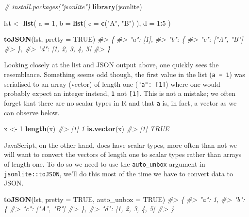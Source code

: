 \documentclass[10pt,]{krantz}
\makeatletter
\newenvironment{Shaded}{\begin{snugshade}}{\end{snugshade}}
\newcommand{\CommentTok}[1]{\textcolor[rgb]{0.37,0.37,0.37}{\textit{#1}}}
\newcommand{\DataTypeTok}[1]{\textcolor[rgb]{0.27,0.27,0.27}{#1}}
\newcommand{\DecValTok}[1]{\textcolor[rgb]{0.06,0.06,0.06}{#1}}
\newcommand{\KeywordTok}[1]{\textcolor[rgb]{0.27,0.27,0.27}{\textbf{#1}}}
\newcommand{\NormalTok}[1]{#1}
\newcommand{\OperatorTok}[1]{\textcolor[rgb]{0.43,0.43,0.43}{\textbf{#1}}}
\newcommand{\OtherTok}[1]{\textcolor[rgb]{0.37,0.37,0.37}{#1}}
\newcommand{\StringTok}[1]{\textcolor[rgb]{0.5,0.5,0.5}{#1}}
\newenvironment{kframe}{%
\medskip{}
\setlength{\fboxsep}{.8em}
 \def\at@end@of@kframe{}%
 \ifinner\ifhmode%
  \def\at@end@of@kframe{\end{minipage}}%
  \begin{minipage}{\columnwidth}%
 \fi\fi%
 \def\FrameCommand##1{\hskip\@totalleftmargin \hskip-\fboxsep
 \colorbox{shadecolor}{##1}\hskip-\fboxsep
     \hskip-\linewidth \hskip-\@totalleftmargin \hskip\columnwidth}%
 \MakeFramed {\advance\hsize-\width
   \@totalleftmargin\z@ \linewidth\hsize
   \@setminipage}}%
 {\par\unskip\endMakeFramed%
 \at@end@of@kframe}
\renewenvironment{Shaded}{\begin{kframe}}{\end{kframe}}
\makeatother
\begin{document}
\begin{Shaded}
\begin{Highlighting}[]
\CommentTok{# install.packages("jsonlite")}
\KeywordTok{library}\NormalTok{(jsonlite)}

\NormalTok{lst <-}\StringTok{ }\KeywordTok{list}\NormalTok{(}
  \DataTypeTok{a =} \DecValTok{1}\NormalTok{,}
  \DataTypeTok{b =} \KeywordTok{list}\NormalTok{(}
    \DataTypeTok{c =} \KeywordTok{c}\NormalTok{(}\StringTok{"A"}\NormalTok{, }\StringTok{"B"}\NormalTok{)}
\NormalTok{  ),}
  \DataTypeTok{d =} \DecValTok{1}\OperatorTok{:}\DecValTok{5}
\NormalTok{)}

\KeywordTok{toJSON}\NormalTok{(lst, }\DataTypeTok{pretty =} \OtherTok{TRUE}\NormalTok{)}
\CommentTok{#> \{}
\CommentTok{#>   "a": [1],}
\CommentTok{#>   "b": \{}
\CommentTok{#>     "c": ["A", "B"]}
\CommentTok{#>   \},}
\CommentTok{#>   "d": [1, 2, 3, 4, 5]}
\CommentTok{#> \}}
\end{Highlighting}
\end{Shaded}

Looking closely at the list and JSON output above, one quickly sees the resemblance. Something seems odd though, the first value in the list (\texttt{a\ =\ 1}) was serialised to an array (vector) of length one (\texttt{"a":\ {[}1{]}}) where one would probably expect an integer instead, \texttt{1} not \texttt{{[}1{]}}. This is not a mistake; we often forget that there are no scalar types in R and that \texttt{a} is, in fact, a vector as we can observe below.

\begin{Shaded}
\begin{Highlighting}[]
\NormalTok{x <-}\StringTok{ }\DecValTok{1}
\KeywordTok{length}\NormalTok{(x)}
\CommentTok{#> [1] 1}
\KeywordTok{is.vector}\NormalTok{(x)}
\CommentTok{#> [1] TRUE}
\end{Highlighting}
\end{Shaded}

JavaScript, on the other hand, does have scalar types, more often than not we will want to convert the vectors of length one to scalar types rather than arrays of length one. To do so we need to use the \texttt{auto\_unbox} argument in \texttt{jsonlite::toJSON}, we'll do this most of the time we have to convert data to JSON.

\begin{Shaded}
\begin{Highlighting}[]
\KeywordTok{toJSON}\NormalTok{(lst, }\DataTypeTok{pretty =} \OtherTok{TRUE}\NormalTok{, }\DataTypeTok{auto_unbox =} \OtherTok{TRUE}\NormalTok{)}
\CommentTok{#> \{}
\CommentTok{#>   "a": 1,}
\CommentTok{#>   "b": \{}
\CommentTok{#>     "c": ["A", "B"]}
\CommentTok{#>   \},}
\CommentTok{#>   "d": [1, 2, 3, 4, 5]}
\CommentTok{#> \}}
\end{Highlighting}
\end{Shaded}
\end{document}
